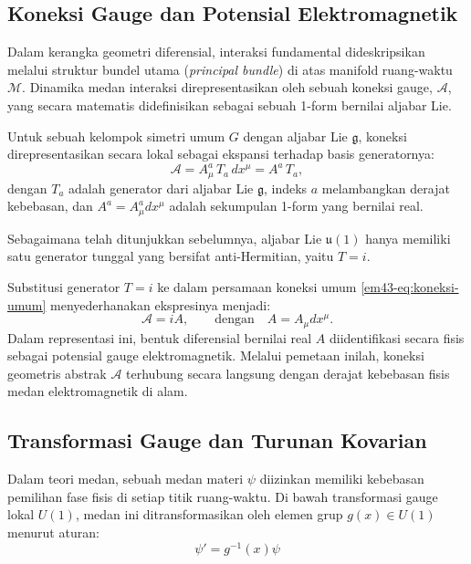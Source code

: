 \subsection{Koneksi Gauge dan Potensial Elektromagnetik}

Dalam kerangka geometri diferensial, interaksi fundamental dideskripsikan melalui struktur bundel utama (\textit{principal bundle}) di atas manifold ruang-waktu $\mathcal{M}$. Dinamika medan interaksi direpresentasikan oleh sebuah koneksi gauge, $\mathcal{A}$, yang secara matematis didefinisikan sebagai sebuah 1-form bernilai aljabar Lie.

Untuk sebuah kelompok simetri umum $G$ dengan aljabar Lie $\mathfrak{g}$, koneksi direpresentasikan secara lokal sebagai ekspansi terhadap basis generatornya:
\begin{equation}\label{em43-eq:koneksi-umum}
  \mathcal{A} = A^a_\mu \, T_a \, d x^\mu = A^a \, T_a,
\end{equation}
dengan $T_a$ adalah generator dari aljabar Lie $\mathfrak{g}$, indeks $a$ melambangkan derajat kebebasan, dan $A^a = A^a_\mu d x^\mu$ adalah sekumpulan 1-form yang bernilai real. 

Sebagaimana telah ditunjukkan sebelumnya, aljabar Lie $\mathfrak{u}(1)$ hanya memiliki satu generator tunggal yang bersifat anti-Hermitian, yaitu $T = i$. 

Substitusi generator $T=i$ ke dalam persamaan koneksi umum \eqref{em43-eq:koneksi-umum} menyederhanakan ekspresinya menjadi:
\begin{equation}\label{em43-eq:koneksi-u1}
  \mathcal{A} = iA, \qquad \text{dengan} \quad A = A_\mu d x^\mu.
\end{equation}
Dalam representasi ini, bentuk diferensial bernilai real $A$ diidentifikasi secara fisis sebagai potensial gauge elektromagnetik. Melalui pemetaan inilah, koneksi geometris abstrak $\mathcal{A}$ terhubung secara langsung dengan derajat kebebasan fisis medan elektromagnetik di alam.

\subsection{Transformasi Gauge dan Turunan Kovarian}

Dalam teori medan, sebuah medan materi $\psi$ diizinkan memiliki kebebasan pemilihan fase fisis di setiap titik ruang-waktu. Di bawah transformasi gauge lokal $U(1)$, medan ini ditransformasikan oleh elemen grup $g(x) \in U(1)$ menurut aturan:
\begin{equation}\label{em43-eq:transf-materi}
  \psi' = g^{-1}(x) \psi
\end{equation}

